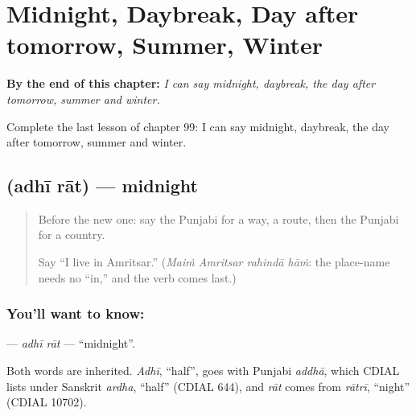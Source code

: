 
\chapter{Midnight, Daybreak, Day after tomorrow, Summer, Winter}
\label{ch:pa-midnight-daybreak-day-after-tomorrow-summer-winter}

\begin{chapteropening}
\textbf{By the end of this chapter:} \emph{I can say midnight, daybreak, the day after tomorrow, summer and winter.}

Complete the last lesson of chapter 99: I can say midnight, daybreak, the day after tomorrow, summer and winter.
\end{chapteropening}

\section[\texorpdfstring{\pa{ਅੱਧੀ} \pa{ਰਾਤ} (adhī rāt)}{ਅੱਧੀ ਰਾਤ (adhī rāt)}]{  (adhī rāt) — midnight}

\label{lesson:PA-C99-adhirat}



\begin{quote}
Before the new one: say the Punjabi for a way, a route, then the Punjabi for a country.

Say \textquotedblleft{}I live in Amritsar.\textquotedblright{} (\emph{Maiṁ Amritsar rahindā hāṁ}: the place-name needs no \textquotedblleft{}in,\textquotedblright{} and the verb comes last.)
\end{quote}

\subsection*{You'll want to know:  }
\textbf{ } — \emph{adhī rāt} — \textquotedblleft{}midnight\textquotedblright{}.

\begin{cousinweb}
Both words are inherited. \emph{Adhī}, \textquotedblleft{}half\textquotedblright{}, goes with Punjabi \emph{addhā}, which CDIAL lists under Sanskrit \emph{ardha}, \textquotedblleft{}half\textquotedblright{} (CDIAL 644), and \emph{rāt} comes from \emph{rātrī}, \textquotedblleft{}night\textquotedblright{} (CDIAL 10702).
\end{cousinweb}

